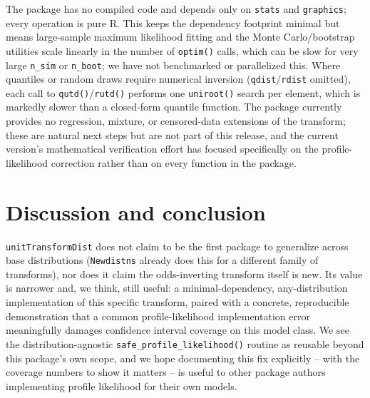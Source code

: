 \documentclass[11pt]{article}
\begin{document}
The package has no compiled code and depends only on \texttt{stats} and
\texttt{graphics}; every operation is pure R. This keeps the dependency
footprint minimal but means large-sample maximum likelihood fitting and
the Monte Carlo/bootstrap utilities scale linearly in the number of
\texttt{optim()} calls, which can be slow for very large
\texttt{n\_sim} or \texttt{n\_boot}; we have not benchmarked or
parallelized this. Where quantiles or random draws require numerical
inversion (\texttt{qdist}/\texttt{rdist} omitted), each call to
\texttt{qutd()}/\texttt{rutd()} performs one \texttt{uniroot()} search
per element, which is markedly slower than a closed-form quantile
function. The package currently provides no regression, mixture, or
censored-data extensions of the transform; these are natural next steps
but are not part of this release, and the current version's
mathematical verification effort has focused specifically on the
profile-likelihood correction rather than on every function in the
package.

\section{Discussion and conclusion}

\texttt{unitTransformDist} does not claim to be the first package to
generalize across base distributions (\texttt{Newdistns} already does
this for a different family of transforms), nor does it claim the
odds-inverting transform itself is new. Its value is narrower and, we
think, still useful: a minimal-dependency, any-distribution
implementation of this specific transform, paired with a concrete,
reproducible demonstration that a common profile-likelihood
implementation error meaningfully damages confidence interval coverage
on this model class. We see the distribution-agnostic
\texttt{safe\_profile\_likelihood()} routine as reusable beyond this
package's own scope, and we hope documenting this fix explicitly --
with the coverage numbers to show it matters -- is useful to other
package authors implementing profile likelihood for their own models.



\end{document}
